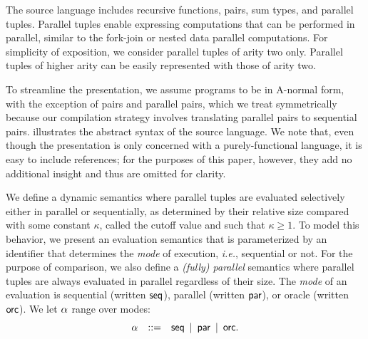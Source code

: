 
The source language includes recursive functions, pairs, sum types,
and parallel tuples.  Parallel tuples enable expressing computations
that can be performed in parallel, similar to the fork-join or nested
data parallel computations.  For simplicity of exposition, we consider
parallel tuples of arity two only.  Parallel tuples of higher arity
can be easily represented with those of arity two.  


To streamline the presentation, we assume programs to be in A-normal
form, with the exception of pairs and parallel pairs, which we treat
symmetrically because our compilation strategy involves translating
parallel pairs to sequential pairs.   illustrates
the abstract syntax of the source language. We note that, even though
the presentation is only concerned with a purely-functional language,
it is easy to include references; for the purposes of this paper,
however, they add no additional insight and thus are omitted for
clarity.


We define a dynamic semantics where parallel tuples are evaluated
selectively either in parallel or sequentially, as determined by their
relative size compared with some constant $\kappa$, called the cutoff
value and such that $\kappa \geq 1$. To model this behavior, we
present an evaluation semantics that is parameterized by an identifier
that determines the {\em mode} of execution, \textit{i.e.}, sequential or
not. For the purpose of comparison, we also define a {\em (fully)
  parallel} semantics where parallel tuples are always evaluated in
parallel regardless of their size.  The {\em mode} of an evaluation is
sequential (written $\textsf{seq}$), parallel (written $\textsf{par}$), or oracle
(written $\textsf{orc}$).  We let $\alpha$ range over modes:
$$\alpha \quad {\bf ::=} \quad \textsf{seq} \, {\bf \,\,\mid\,\,} \, \textsf{par} \, {\bf \,\,\mid\,\,} \, \textsf{orc}.$$

